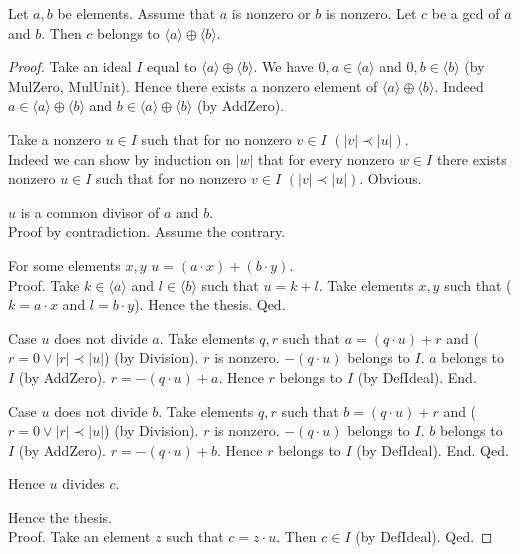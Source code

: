 \documentclass{article}
\begin{document}
  \begin{forthel}
    \begin{theorem}[id=GCDin]
      Let $a,b$ be elements.
      Assume that $a$ is nonzero or $b$ is nonzero.
      Let $c$ be a gcd of $a$ and $b$.
      Then $c$ belongs to $\langle a \rangle \oplus \langle b \rangle$.
    \end{theorem}
    \begin{proof}
      Take an ideal $I$ equal to $\langle a \rangle \oplus \langle b \rangle$.
      We have $0,a \in \langle a \rangle$ and $0,b \in \langle b \rangle$
      (by MulZero, MulUnit).
      Hence there exists a nonzero element of
      $\langle a \rangle \oplus \langle b \rangle$.
      Indeed $a \in \langle a \rangle \oplus \langle b \rangle$ and
      $b \in \langle a \rangle \oplus \langle b \rangle$ (by AddZero).

      Take a nonzero $u \in I$ such that for no nonzero
      $v \in I$ $(|v| \prec |u|)$. \\
      Indeed we can show by induction on $|w|$ that for every nonzero $w \in I$
      there exists nonzero $u \in I$ such that for no nonzero
      $v \in I$ $(|v| \prec |u|)$.
      Obvious.

      $u$ is a common divisor of $a$ and $b$. \\
      Proof by contradiction.
        Assume the contrary.

        For some elements $x,y$ $u = (a \cdot x) + (b \cdot y)$. \\
        Proof.
          Take $k \in \langle a \rangle$ and $l \in \langle b \rangle$ such that
          $u = k + l$.
          Take elements $x,y$ such that ($k = a \cdot x$ and $l = b \cdot y$).
          Hence the thesis.
        Qed.

        Case $u$ does not divide $a$.
          Take elements $q,r$ such that $a = (q \cdot u) + r$ and
          ($r = 0 \vee |r| \prec |u|$) (by Division).
          $r$ is nonzero.
          $-(q \cdot u)$ belongs to $I$.
          $a$ belongs to $I$ (by AddZero).
          $r = - (q \cdot u) + a$.
          Hence $r$ belongs to $I$ (by DefIdeal).
        End.

        Case $u$ does not divide $b$.
          Take elements $q,r$ such that $b = (q \cdot u) + r$ and
          ($r = 0 \vee |r| \prec |u|$) (by Division).
          $r$ is nonzero.
          $-(q \cdot u)$ belongs to $I$.
          $b$ belongs to $I$ (by AddZero).
          $r = - (q \cdot u) + b$.
          Hence $r$ belongs to $I$ (by DefIdeal).
        End.
      Qed.

      Hence $u$ divides $c$.

      Hence the thesis. \\
      Proof.
        Take an element $z$ such that $c = z \cdot u$.
        Then $c \in I$ (by DefIdeal).
      Qed.
    \end{proof}
  \end{forthel}
\end{document}
